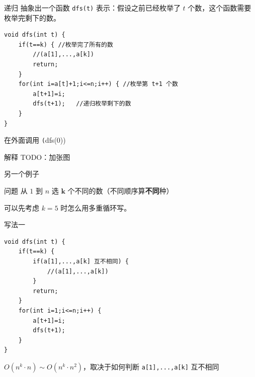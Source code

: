 \documentclass[11pt,aspectratio=169]{beamer}
\begin{document}
\begin{frame}[fragile]{递归}
    抽象出一个函数 \texttt{dfs(t)} 表示：假设之前已经枚举了 $t$ 个数，这个函数需要枚举完剩下的数。
\pause

\begin{lstlisting}
void dfs(int t) {
    if(t==k) { //枚举完了所有的数
        //(a[1],...,a[k])
        return;
    }
    for(int i=a[t]+1;i<=n;i++) { //枚举第 t+1 个数
        a[t+1]=i;
        dfs(t+1);   //递归枚举剩下的数
    }
}
\end{lstlisting} 

在外面调用 \texttt(dfs(0))
\end{frame}

\begin{frame}{解释}
TODO：加张图
\end{frame}

\begin{frame}{另一个例子}
    \begin{block}{问题}
        从 $1$ 到 $n$ 选 $\mathbf{k}$ 个不同的数（不同顺序算\textbf{不同}种）
    \end{block}
    \pause

    可以先考虑 $k=5$ 时怎么用多重循环写。
\end{frame}

\begin{frame}[fragile]{写法一}
\begin{lstlisting}
void dfs(int t) {
    if(t==k) {
        if(a[1],...,a[k] 互不相同) {
            //(a[1],...,a[k])
        }
        return;
    }
    for(int i=1;i<=n;i++) {
        a[t+1]=i;
        dfs(t+1);
    }
}
\end{lstlisting} 

$O(n^k\cdot n)\sim O(n^k\cdot n^2)$，取决于如何判断 \texttt{a[1],...,a[k]} 互不相同
\end{frame}
\end{document}
